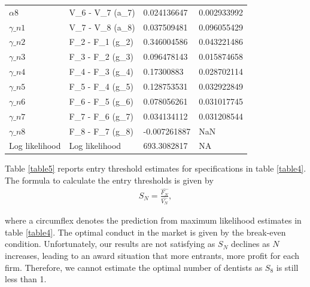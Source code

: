 \documentclass[a4paper,11pt]{article}
\begin{document}
\begin{table}[]
{\begin{tabular}{@{}llll@{}}
$\alpha8$         & V\_6 - V\_7 (a\_7)                                                            & 0.024136647  & 0.002933992 \\
$\gamma\_n1$      & V\_7 - V\_8 (a\_8)                                                            & 0.037509481  & 0.096055429 \\
$\gamma\_n2$      & F\_2 - F\_1 (g\_2)                                                            & 0.346004586  & 0.043221486 \\
$\gamma\_n3$      & F\_3 - F\_2 (g\_3)                                                            & 0.096478143  & 0.015874658 \\
$\gamma\_n4$      & F\_4 - F\_3 (g\_4)                                                            & 0.17300883   & 0.028702114 \\
$\gamma\_n5$      & F\_5 - F\_4 (g\_5)                                                            & 0.128753531  & 0.032922849 \\
$\gamma\_n6$      & F\_6 - F\_5 (g\_6)                                                            & 0.078056261  & 0.031017745 \\
$\gamma\_n7$      & F\_7 - F\_6 (g\_7)                                                            & 0.034134112  & 0.031208544 \\
$\gamma\_n8$      & F\_8 - F\_7 (g\_8)                                                            & -0.007261887 & NaN         \\
Log likelihood & Log likelihood                                                                & 693.3082817  & NA          \\ \bottomrule
\end{tabular}}
\end{table}

Table \ref{table5} reports entry threshold estimates for specifications in table \ref{table4}. The formula to calculate the entry thresholds is given by
\begin{align}
    S_N=\frac{\hat{F_N}}{\hat{V_N}},
\end{align}

where a circumflex denotes the prediction from maximum likelihood estimates in table \ref{table4}. The optimal conduct in the market is given by the break-even condition. Unfortunately, our results are not satisfying as $S_N$ declines as $N$ increases, leading to an award situation that more entrants, more profit for each firm. Therefore, we cannot estimate the optimal number of dentists as $S_8$ is still less than 1. 
\end{document}
